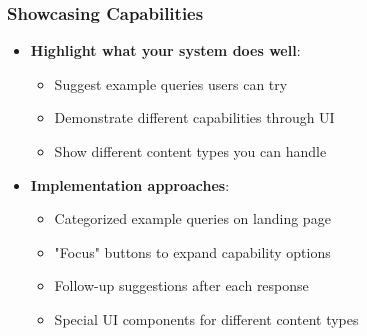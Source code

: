 \begin{frame}
    \frametitle{Showcasing Capabilities}
    
    \begin{itemize}
        \item \textbf{Highlight what your system does well}:
        \begin{itemize}
            \item Suggest example queries users can try
            \item Demonstrate different capabilities through UI
            \item Show different content types you can handle
        \end{itemize}
        \item \textbf{Implementation approaches}:
        \begin{itemize}
            \item Categorized example queries on landing page
            \item "Focus" buttons to expand capability options
            \item Follow-up suggestions after each response
            \item Special UI components for different content types
        \end{itemize}
    \end{itemize}
    
    \begin{center}
    \end{center}
\end{frame}

